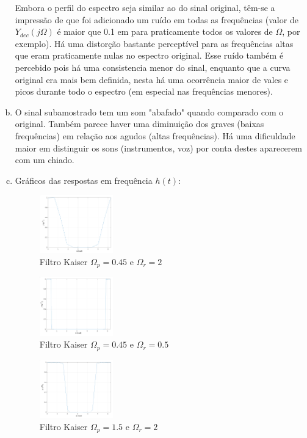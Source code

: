 \documentclass{article}
\begin{document}
\begin{enumerate}[(a)]
        Embora o perfil do espectro seja similar ao do sinal original, têm-se a impressão de que foi adicionado um ruído em todas as frequências (valor de $Y_{dec}(j\Omega)$ é maior que 0.1 em para praticamente todos os valores de $\Omega$, por exemplo). Há uma distorção bastante perceptível para as frequências altas que eram praticamente nulas no espectro original. Esse ruído também é percebido pois há uma consistencia menor do sinal, enquanto que a curva original era mais bem definida, nesta há uma ocorrência maior de vales e picos durante todo o espectro (em especial nas frequências menores).

\break\vfill

\item
    O sinal subamostrado tem um som "abafado" quando comparado com o original. Também parece haver uma diminuição dos graves (baixas frequências) em relação aos agudos (altas frequências). Há uma dificuldade maior em distinguir os sons (instrumentos, voz) por conta destes aparecerem com um chiado. 

\item
    Gráficos das respostas em frequência $h(t)$:

    \begin{figure}[H]
    \centering
    \includegraphics[width=0.3\textwidth]{images/h1.png}
        \caption{Filtro Kaiser $\Omega_p = 0.45$ e $\Omega_r = 2$}
    \end{figure}

    \begin{figure}[H]
    \centering
    \includegraphics[width=0.3\textwidth]{images/h2.png}
        \caption{Filtro Kaiser $\Omega_p = 0.45$ e $\Omega_r = 0.5$}
    \end{figure}

    \begin{figure}[H]
    \centering
    \includegraphics[width=0.3\textwidth]{images/h3.png}
        \caption{Filtro Kaiser $\Omega_p = 1.5$ e $\Omega_r = 2$}
    \end{figure}


\end{enumerate}
\end{document}
